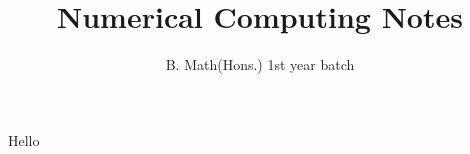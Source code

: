 \documentclass{article}
\title{Numerical Computing Notes}
\author{B. Math(Hons.) 1st year batch}
\date{}
\begin{document}
  \maketitle

	Hello
\end{document}

